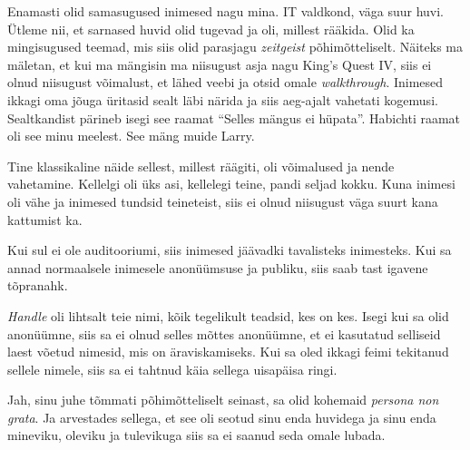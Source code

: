 Enamasti olid samasugused inimesed nagu mina. IT valdkond, väga suur huvi. 
Ütleme nii, et sarnased huvid olid tugevad ja oli, millest rääkida. Olid ka 
mingisugused teemad, mis siis olid parasjagu \emph{zeitgeist} põhimõtteliselt. 
Näiteks ma mäletan, et kui ma mängisin ma niisugust asja nagu King's Quest 
IV, siis ei olnud niisugust võimalust, et lähed 
veebi ja otsid omale \emph{walkthrough}. Inimesed ikkagi oma jõuga üritasid 
sealt läbi närida ja siis aeg-ajalt vahetati kogemusi. Sealtkandist pärineb 
isegi see raamat \enquote{Selles mängus ei hüpata}. 
Habichti raamat oli see minu meelest. See mäng muide 
Larry.

Tine klassikaline näide sellest, millest räägiti, oli võimalused ja nende 
vahetamine. Kellelgi oli üks asi, kellelegi teine, pandi seljad kokku. Kuna 
inimesi oli vähe ja inimesed tundsid teineteist, siis ei olnud niisugust väga 
suurt kana kattumist ka.


Kui sul ei ole auditooriumi, siis inimesed jäävadki tavalisteks inimesteks. Kui 
sa annad normaalsele inimesele anonüümsuse ja publiku, siis saab tast igavene 
tõpranahk.
                 

\emph{Handle} oli lihtsalt teie nimi, kõik tegelikult teadsid, kes on kes. 
Isegi kui sa olid anonüümne, siis sa ei olnud selles mõttes anonüümne, et ei 
kasutatud selliseid laest võetud nimesid, mis on  äraviskamiseks. Kui sa oled 
ikkagi feimi tekitanud sellele nimele, siis sa ei tahtnud käia sellega 
uisapäisa ringi. 


Jah, sinu juhe tõmmati põhimõtteliselt seinast,  sa olid kohemaid \emph{persona 
non grata}. Ja arvestades sellega, et see oli seotud sinu enda huvidega ja sinu 
enda mineviku, oleviku ja tulevikuga siis sa ei saanud seda omale lubada.

